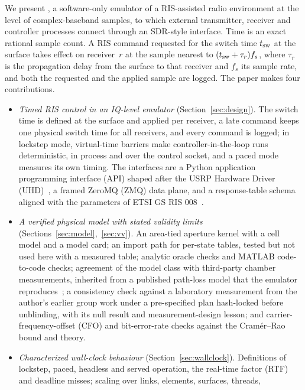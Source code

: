 We present \sremu{}, a software-only emulator of a RIS-assisted radio environment at the
level of complex-baseband samples, to which external transmitter, receiver and controller
processes connect through an SDR-style interface. Time is an exact rational sample count.
A RIS command requested for the switch time $t_{\mathrm{sw}}$ at the surface
takes effect on receiver~$r$ at the sample nearest to $(t_{\mathrm{sw}}+\tau_r)f_s$, where $\tau_r$ is
the propagation delay from the surface to that receiver and $f_s$ its sample rate, and
both the requested and the applied sample are logged. The paper makes four contributions.
\begin{itemize}
\item \emph{Timed RIS control in an IQ-level emulator} (Section~\ref{sec:design}).
  The switch time is defined at the surface and applied per receiver, a
  late command keeps one physical switch time for all receivers, and every command is logged;
  in lockstep mode, virtual-time barriers make controller-in-the-loop runs deterministic, in
  process and over the control socket, and a paced mode measures its own timing. The
  interfaces are a Python application programming
  interface (API) shaped after the USRP Hardware Driver (UHD)~\cite{UHDManual}, a framed ZeroMQ
  (ZMQ) data plane, and a response-table schema aligned with the parameters of ETSI GS RIS
  008~\cite{ETSI_GS_RIS008}.
\item \emph{A verified physical model with stated validity limits}
  (Sections~\ref{sec:model},~\ref{sec:vv}). An area-tied aperture kernel
  with a cell model and a model card; an import path for per-state tables, tested but not
  used here with a measured table; \numOracleCount{} analytic oracle checks and MATLAB
  code-to-code checks; agreement of the model class with third-party chamber measurements,
  inherited from a published path-loss model that the emulator reproduces~\cite{Tang2022mmWave};
  a consistency check against a laboratory measurement from the author's earlier group work under a pre-specified
  plan hash-locked before unblinding, with its null result and measurement-design lesson; and
  carrier-frequency-offset (CFO) and bit-error-rate checks against the Cram\'er--Rao bound and
  theory.
\item \emph{Characterized wall-clock behaviour} (Section~\ref{sec:wallclock}).
  Definitions of lockstep, paced, headless and served operation, the
  real-time factor (RTF) and deadline misses; scaling over links, elements, surfaces, threads,

\end{itemize}
